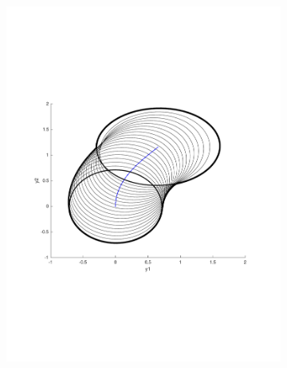\begin{figure}
  \centering
  \begin{subfigure}[b]{0.4\textwidth}
    \includegraphics[width=\textwidth]{figures/experiments/sos-calculation}
  \end{subfigure}
  \quad
  \begin{subfigure}[b]{0.4\textwidth}

\end{subfigure}
\end{figure}
